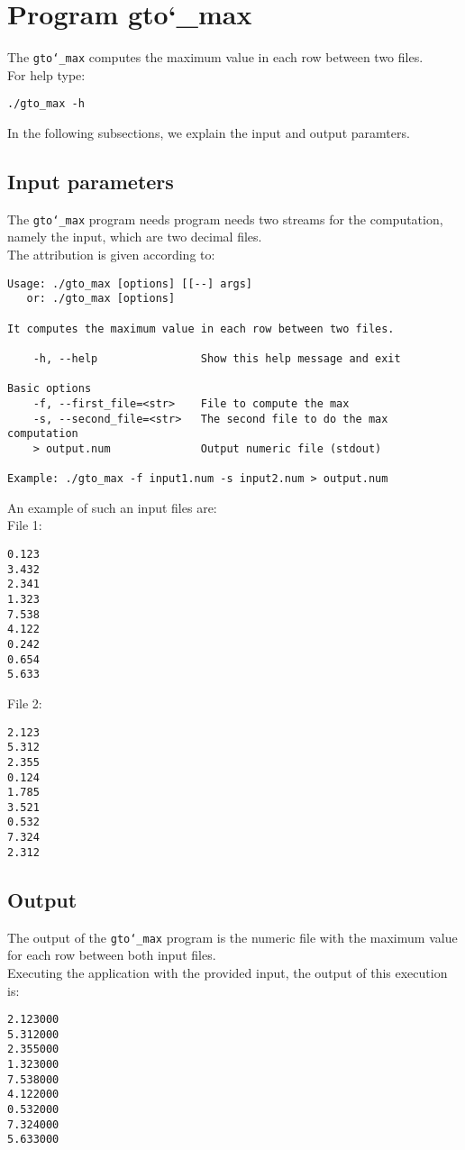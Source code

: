 \section{Program gto\char`_max}
The \texttt{gto\char`_max} computes the maximum value in each row between two files.\\
For help type:
\begin{lstlisting}
./gto_max -h
\end{lstlisting}
In the following subsections, we explain the input and output paramters.

\subsection*{Input parameters}

The \texttt{gto\char`_max} program needs program needs two streams for the computation, namely the input, which are two decimal files.\\
The attribution is given according to:
\begin{lstlisting}
Usage: ./gto_max [options] [[--] args]
   or: ./gto_max [options]

It computes the maximum value in each row between two files.

    -h, --help                Show this help message and exit

Basic options
    -f, --first_file=<str>    File to compute the max
    -s, --second_file=<str>   The second file to do the max computation
    > output.num              Output numeric file (stdout)

Example: ./gto_max -f input1.num -s input2.num > output.num
\end{lstlisting}
An example of such an input files are:\\
File 1:
\begin{lstlisting}
0.123
3.432
2.341
1.323
7.538
4.122
0.242
0.654
5.633
\end{lstlisting}
File 2:
\begin{lstlisting}
2.123
5.312
2.355
0.124
1.785
3.521
0.532
7.324
2.312
\end{lstlisting}

\subsection*{Output}
The output of the \texttt{gto\char`_max} program is the numeric file with the maximum value for each row between both input files.\\
Executing the application with the provided input, the output of this execution is:
\begin{lstlisting}
2.123000
5.312000
2.355000
1.323000
7.538000
4.122000
0.532000
7.324000
5.633000
\end{lstlisting}